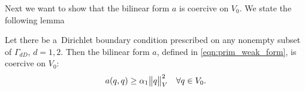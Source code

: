 % 
%
Next we want to show that the bilinear form $a$ is coercive on $V_0$.
We state the following lemma
\begin{lemma} \label{lem:prim_form_a_coercivity_V0}
    Let there be a~Dirichlet boundary condition prescribed on any nonempty subset of $\Gamma_{dD}$, $d=1,2$.
    Then the bilinear form $a$, defined in \eqref{eqn:prim_weak_form}, is coercive on $V_0$:
    \begin{equation} \label{eqn:prim_form_a_coercivity_V0}
        a(q,q) \geq \alpha_1\bigl\Vert q\bigr\Vert^2_V \quad \forall q\in V_0.
    \end{equation}
\end{lemma}

